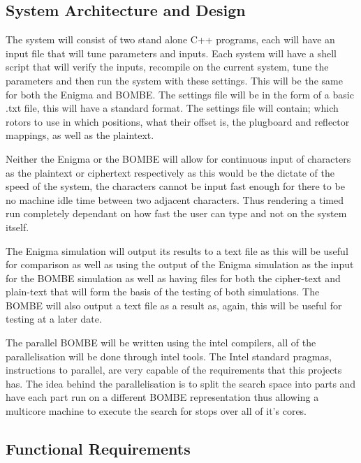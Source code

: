 \documentclass[12pt,a4paper]{article}
\begin{document}
\subsection{System Architecture and Design}

The system will consist of two stand alone C++ programs, each will have an input file that will tune parameters and inputs. Each system will have a shell script that will verify the inputs, recompile on the current system, tune the parameters and then run the system with these settings. This will be the same for both the Enigma and BOMBE. The settings file will be in the form of a basic .txt file, this will have a standard format. The settings file will contain; which rotors to use in which positions, what their offset is, the plugboard and reflector mappings, as well as the plaintext. 

Neither the Enigma or the BOMBE will allow for continuous input of characters as the plaintext or ciphertext respectively as this would be the dictate of the speed of the system, the characters cannot be input fast enough for there to be no machine idle time between two adjacent characters. Thus rendering a timed run completely dependant on how fast the user can type and not on the system itself.

The Enigma simulation will output its results to a text file as this will be useful for comparison as well as using the output of the Enigma simulation as the input for the BOMBE simulation as well as having files for both the cipher-text and plain-text that will form the basis of the testing of both simulations. The BOMBE will also output a text file as a result as, again, this will be useful for testing at a later date. 

The parallel BOMBE will be written using the intel compilers, all of the parallelisation will be done through intel tools. The Intel standard pragmas, instructions to parallel, are very capable of the requirements that this projects has. The idea behind the parallelisation is to split the search space into parts and have each part run on a different BOMBE representation thus allowing a multicore machine to execute the search for stops over all of it's cores. 

\subsection{Functional Requirements}
\end{document}
